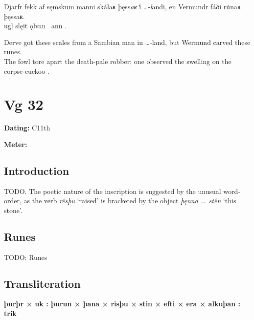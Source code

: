 \bpg\bpa[0]%
\startsub Djarfr fekk af sęmskum manni skálaʀ þęss\emph{aʀ} i̇́ \dots-\emph{l}andi, en Vermundr fáði ru̇naʀ þęssaʀ.\endsub \\
ugl  slęit ǫlvan \hld\ ann  .\epa

\bpb Derve got these scales from a Sambian man in \dots-land, but Wermund carved these runes. \\
The fowl tore apart the death-pale robber; one observed the swelling on the corpse-cuckoo .\epb\epg

\sectionline\clearpage


\section{Vg 32}

\begin{flushright}%
\textbf{Dating:} C11th

\textbf{Meter:} \Fornyrdislag
\end{flushright}%

\subsection{Introduction}

TODO.  The poetic nature of the inscription is suggested by the unusual word-order, as the verb \emph{rêsþu} ‘raised’ is bracketed by the object \emph{þęnna \dots\ stên} ‘this stone’.

\subsection{Runes}

TODO: Runes%

\subsection{Transliteration}

\textbf{þurþr × uk : þurun × þana × risþu × stin × efti × era × alkuþan : trik}

